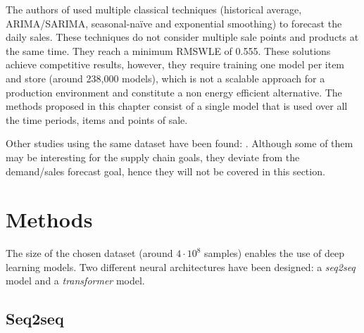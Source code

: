 The authors of \autocite{Steves2018} used multiple classical techniques (historical average, ARIMA/SARIMA, seasonal-naïve and exponential smoothing) to forecast the daily sales. These techniques do not consider multiple sale points and products at the same time. They reach a minimum RMSWLE of 0.555. These solutions achieve competitive results, however, they require training one model per item and store (around 238,000 models), which is not a scalable approach for a production environment and constitute a non energy efficient alternative. The methods proposed in this chapter consist of a single model that is used over all the time periods, items and points of sale.

Other studies using the same dataset have been found: \autocite{wang2020c, Shaikhha2020, Schleich2019, Lim2019, Curtin2020, Malik2019, Kuleshov2018, Khamis2020}. Although some of them may be interesting for the supply chain goals, they deviate from the demand/sales forecast goal, hence they will not be covered in this section.

\section{Methods} \label{sec:salesforecast_methods}
The size of the chosen dataset  (around $4\cdot10^8$ samples) enables the use of deep learning models. Two different neural architectures have been designed: a \textit{seq2seq} model and a \textit{transformer} model.

\subsection{Seq2seq}  %


